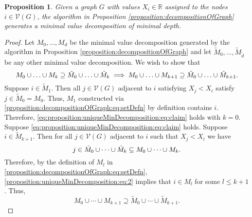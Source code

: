 \documentclass{article}
\newtheorem{proposition}{Proposition}
\theoremstyle{remark}
\newcommand{\R}[0]{\mathbb{R}}
\begin{document}
\begin{proposition}{\label{proposition:uniqueMinDecomposition}}
	Given a graph $G$ with values $X_i\in\R$ assigned to the nodes $i\in\mathcal{V}(G)$, the algorithm in Proposition \ref{proposition:decompositionOfGraph} generates a minimal value decomposition of minimal depth. 
\end{proposition}
\begin{proof}
	Let $M_0,\ldots,M_d$ be the minimal value decomposition generated by the algorithm in Proposition \ref{proposition:decompositionOfGraph} and let $\tilde{M}_0,\ldots,\tilde{M}_{\tilde{d}}$ be any other minimal value decomposition. We wish to show that 
	\begin{equation}{\label{eq:proposition:uniqueMinDecomposition:eq:claim}}
		M_0\cup\ldots\cup M_k \supseteq \tilde{M}_0\cup\ldots\cup\tilde{M}_k \implies M_0\cup\ldots\cup M_{k+1}\supseteq \tilde{M}_0\cup\ldots\cup\tilde{M}_{k+1}.
	\end{equation}
	Suppose $i \in \tilde{M}_1$.  Then all $j\in\mathcal{V}(G)$ adjacent to $i$ satisfying $X_j<X_i$ satisfy $j\in\tilde{M}_0=M_0$.  Thus, $M_1$ constructed via \eqref{proposition:decompositionOfGraph:eq:setDefn} by definition contains $i$.  Therefore, \eqref{eq:proposition:uniqueMinDecomposition:eq:claim} holds with $k=0$.
	Suppose \eqref{eq:proposition:uniqueMinDecomposition:eq:claim} holds. Suppose $i\in\tilde{M}_{k+1}$. Then for all $j\in\mathcal{V}(G)$ adjacent to $i$ such that $X_j<X_i$ we have 
\begin{equation}{\label{proposition:uniqueMinDecomposition:eq:2}}
j\in \tilde{M}_0\cup\cdots\cup \tilde{M}_k \subseteq M_0\cup\cdots\cup M_k.
\end{equation}  
Therefore, by the definition of $M_l$ in \eqref{proposition:decompositionOfGraph:eq:setDefn}, \eqref{proposition:uniqueMinDecomposition:eq:2} implies that $i\in M_l$ for some $l\leq k+1$. Thus, 
\begin{equation}
	M_0\cup\cdots\cup M_{k+1} \supseteq \tilde{M}_0\cup\cdots\cup\tilde{M}_{k+1}.
\end{equation}
\end{proof}
\end{document}
